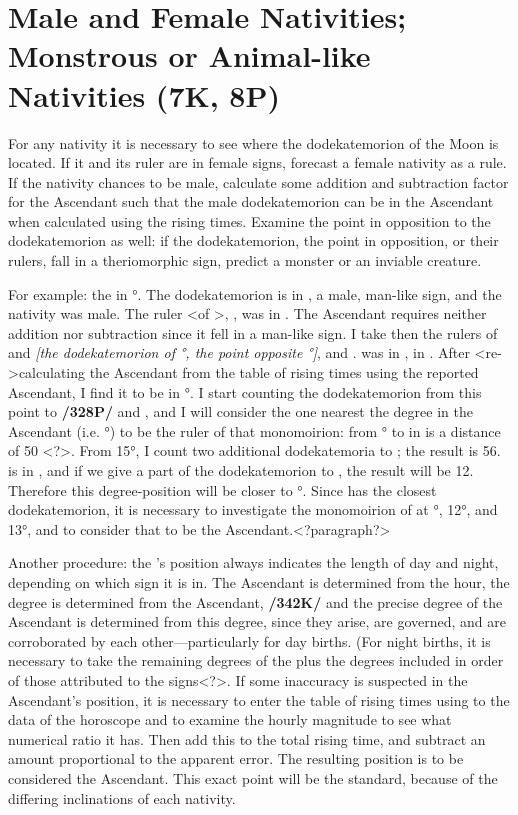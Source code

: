 \section{Male and Female Nativities; Monstrous or Animal-like Nativities (7K, 8P)}

For any nativity it is necessary to see where the dodekatemorion of the Moon is located. If it and its ruler are in female signs, forecast a female nativity as a rule. If the nativity chances to be male, calculate
some addition and subtraction factor for the Ascendant such that the male dodekatemorion can be in the Ascendant when calculated using the rising times. Examine the point in opposition to the dodekatemorion as well: if the dodekatemorion, the point in opposition, or their rulers, fall in a theriomorphic sign, predict a monster or an inviable creature.

For example: the \Moon\xspace in \Pisces\xspace 19°. The dodekatemorion is in \Libra, a male, man-like sign, and the nativity was male. The ruler <of \Libra>, \Venus, was in \Sagittarius. The Ascendant requires neither addition nor subtraction since it fell in a man-like sign. I take then the rulers of \Libra\xspace and \Aries\textit{[the dodekatemorion of \Virgo\xspace 19°, the point opposite \Pisces\xspace 19°]}, \Venus\xspace and \Mars. \Mars\xspace was in \Virgo, \Venus\xspace in \Sagittarius. After <re->calculating the Ascendant from the table of rising times using the reported Ascendant, I find it to be in \Leo\xspace 15°. I start counting the dodekatemorion from this point to \Mars\xspace \textbf{/328P/} and \Venus, and I will consider the one nearest the degree in the Ascendant (i.e. \Leo\xspace 15°) to be the ruler of that monomoirion: from \Leo\xspace 15° to \Mars\xspace in \Virgo\xspace is a distance of 50 <?>. From 15°, I count two additional dodekatemoria to \Scorpio; the result is 56. \Venus\xspace is in \Sagittarius, and
if we give a part of the dodekatemorion to \Sagittarius, the result will be 12. Therefore this degree-position will be closer to \Leo\xspace 15°. Since \Venus\xspace has the closest dodekatemorion, it is necessary to investigate the monomoirion of \Venus\xspace at \Leo\xspace 11°, 12°, and 13°, and to consider that to be the Ascendant.<?paragraph?>

Another procedure: the \Sun’s position always indicates the length of day and night, depending on which sign it is in. The Ascendant is determined from the hour, the degree is determined from the
Ascendant, \textbf{/342K/} and the precise degree of the Ascendant is determined from this degree, since they arise, are governed, and are corroborated by each other—particularly for day births. (For night births, it is necessary to take the remaining degrees of the \Sun\xspace plus the degrees included in order of those attributed to
the signs<?>. If some inaccuracy is suspected in the Ascendant’s position, it is necessary to enter the table of rising times using to the data of the horoscope and to examine the hourly magnitude to see what numerical ratio it has. Then add this to the total rising time, and subtract an amount proportional to the apparent error. The resulting position is to be considered the Ascendant. This exact point will be the
standard, because of the differing inclinations of each nativity.

